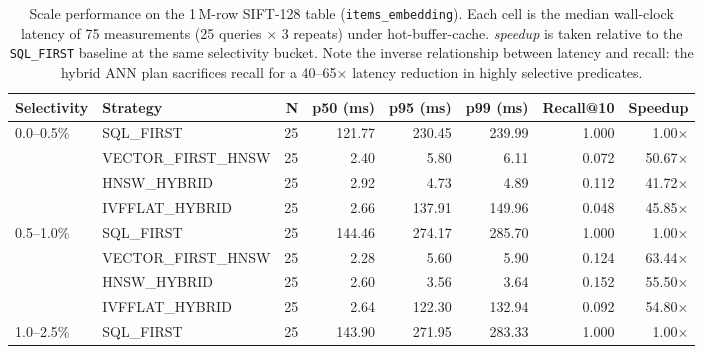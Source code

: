 \begin{table}[t]
\centering
\caption{Scale performance on the 1\,M-row SIFT-128 table
(\texttt{items\_embedding}).  Each cell is the median wall-clock latency
of 75 measurements (25 queries $\times$ 3 repeats) under
hot-buffer-cache.  \emph{speedup} is taken relative to the
\texttt{SQL\_FIRST} baseline at the same selectivity bucket.  Note the
inverse relationship between latency and recall: the hybrid ANN plan
sacrifices recall for a 40--65$\times$ latency reduction in highly
selective predicates.}
\label{tab:scale-1M}
\small
\setlength{\tabcolsep}{4pt}
\begin{tabular}{l l r r r r r r}
\hline
\textbf{Selectivity} & \textbf{Strategy} & \textbf{N} & \textbf{p50 (ms)} & \textbf{p95 (ms)} & \textbf{p99 (ms)} & \textbf{Recall@10} & \textbf{Speedup} \\
\hline
0.0--0.5\%   & SQL\_FIRST         & 25 & 121.77 & 230.45 & 239.99 & 1.000 & 1.00$\times$ \\
             & VECTOR\_FIRST\_HNSW & 25 &   2.40 &   5.80 &   6.11 & 0.072 & 50.67$\times$ \\
             & HNSW\_HYBRID        & 25 &   2.92 &   4.73 &   4.89 & 0.112 & 41.72$\times$ \\
             & IVFFLAT\_HYBRID     & 25 &   2.66 & 137.91 & 149.96 & 0.048 & 45.85$\times$ \\
0.5--1.0\%   & SQL\_FIRST         & 25 & 144.46 & 274.17 & 285.70 & 1.000 & 1.00$\times$ \\
             & VECTOR\_FIRST\_HNSW & 25 &   2.28 &   5.60 &   5.90 & 0.124 & 63.44$\times$ \\
             & HNSW\_HYBRID        & 25 &   2.60 &   3.56 &   3.64 & 0.152 & 55.50$\times$ \\
             & IVFFLAT\_HYBRID     & 25 &   2.64 & 122.30 & 132.94 & 0.092 & 54.80$\times$ \\
1.0--2.5\%   & SQL\_FIRST         & 25 & 143.90 & 271.95 & 283.33 & 1.000 & 1.00$\times$ \\

\end{tabular}
\end{table}
